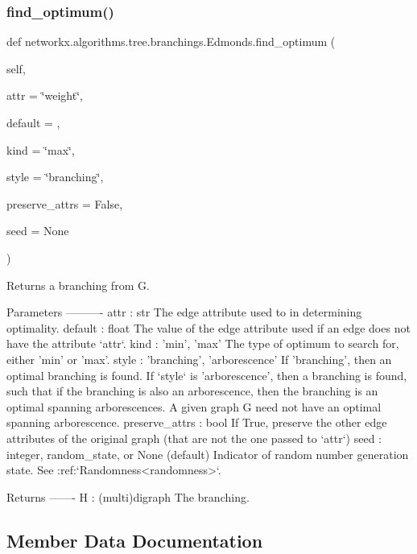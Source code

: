 \subsubsection{\texorpdfstring{find\+\_\+optimum()}{find\_optimum()}}
{\footnotesize\ttfamily def networkx.\+algorithms.\+tree.\+branchings.\+Edmonds.\+find\+\_\+optimum (\begin{DoxyParamCaption}\item[{}]{self,  }\item[{}]{attr = {\ttfamily \char`\"{}weight\char`\"{}},  }\item[{}]{default = {},  }\item[{}]{kind = {\ttfamily \char`\"{}max\char`\"{}},  }\item[{}]{style = {\ttfamily \char`\"{}branching\char`\"{}},  }\item[{}]{preserve\+\_\+attrs = {\ttfamily False},  }\item[{}]{seed = {\ttfamily None} }\end{DoxyParamCaption})}

\begin{DoxyVerb}Returns a branching from G.

Parameters
----------
attr : str
    The edge attribute used to in determining optimality.
default : float
    The value of the edge attribute used if an edge does not have
    the attribute `attr`.
kind : {'min', 'max'}
    The type of optimum to search for, either 'min' or 'max'.
style : {'branching', 'arborescence'}
    If 'branching', then an optimal branching is found. If `style` is
    'arborescence', then a branching is found, such that if the
    branching is also an arborescence, then the branching is an
    optimal spanning arborescences. A given graph G need not have
    an optimal spanning arborescence.
preserve_attrs : bool
    If True, preserve the other edge attributes of the original
    graph (that are not the one passed to `attr`)
seed : integer, random_state, or None (default)
    Indicator of random number generation state.
    See :ref:`Randomness<randomness>`.

Returns
-------
H : (multi)digraph
    The branching.\end{DoxyVerb}
 

\subsection{Member Data Documentation}
\mbox{\label{classnetworkx_1_1algorithms_1_1tree_1_1branchings_1_1Edmonds_a0c066fa3ee5d523fa4ecae69fe188c74}} 

